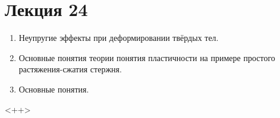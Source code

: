 \section{Лекция 24}
\begin{enumerate}
\item Неупругие эффекты при деформировании твёрдых тел.
\item Основные понятия теории понятия пластичности на примере простого растяжения-сжатия стержня.
\item Основные понятия.
\end{enumerate}<++>

